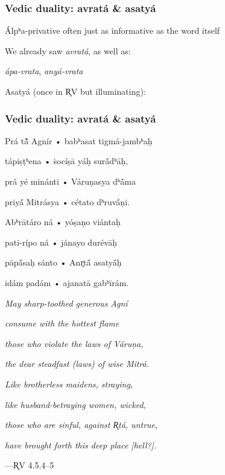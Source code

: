 \documentclass[pdf]{beamer}
\newcommand{\Subitem}[1]{{\setlength\itemindent{12pt} \item[-] #1}}
\begin{document}
\begin{frame} \frametitle{Vedic duality: avratá \& asatyá}
\begin{itemize}
	\item Álpʰa-privative often just as informative as the word itself
	\item We already saw \textit{avratá}, as well as:
	\Subitem {\textit{ápa-vrata}, \textit{anyá-vrata}}
	\item Asatyá (once in R̥V but illuminating):
\end{itemize}
\end{frame}

\begin{frame} \frametitle{Vedic duality: avratá \& asatyá}
\begin{center}
\begin{multicols}{2}
\small{
	Prá tā̃́ Agnír • babʰasat tigmá-jambʰaḥ

	tápiṣṭʰena • ṡocíṣā yáḥ surā́dʰāḥ,

	prá yé minánti • Váruṇasya dʰā́ma

	priyā́ Mitrásya • cétato dʰruvā́ṇi.

	\vspace{12pt}

	Abʰrātáro ná • yóṣaṇo viántaḥ

	pati-rípo ná • jánayo durévāḥ

	pāpā́saḥ sánto • Anr̥tā́ asatyā́ḥ

	idám padám • ajanatā gabʰīrám.

	\vspace{12pt}

	\textit{May sharp-toothed generous Agní}

	\textit{consume with the hottest flame}

	\textit{those who violate the laws of Váruṇa,}

	\textit{the dear steadfast (laws) of wise Mitrá.}

	\vspace{12pt}

	\textit{Like brotherless maidens, straying,}

	\textit{like husband-betraying women, wicked,}

	\textit{those who are sinful, against R̥tá, untrue,}

	\textit{have brought forth this deep place [hell?].}
}
\end{multicols}
 ---R̥V 4.5.4--5
\end{center}
\end{frame}
\end{document}
